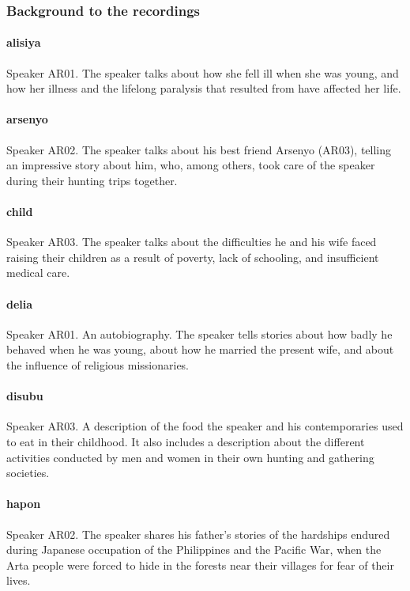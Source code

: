 \subsubsection*{Background to the recordings}

\paragraph{alisiya}		%
Speaker AR01. The speaker talks about how she fell ill when she was young, and how her illness and the lifelong paralysis that resulted from have affected her life.

\paragraph{arsenyo}	%
Speaker AR02. The speaker talks about his best friend Arsenyo (AR03), telling an impressive story about him, who, among others, took care of the speaker during their hunting trips together.

\paragraph{child}		%
Speaker AR03. The speaker talks about the difficulties he and his wife faced raising their children as a result of poverty, lack of schooling, and insufficient medical care. 

\paragraph{delia}		%
Speaker AR01. An autobiography. The speaker tells stories about how badly he behaved when he was young, about how he married the present wife, and about the influence of religious missionaries.

\paragraph{disubu}		%
Speaker AR03. A description of the food the speaker and his contemporaries used to eat in their childhood. It also includes a description about the different activities conducted by men and women in their own hunting and gathering societies.

\paragraph{hapon}		%
Speaker AR02. The speaker shares his father's stories of the hardships endured during Japanese occupation of the Philippines and the Pacific War, when the Arta people were forced to hide in the forests near their villages for fear of their lives.

